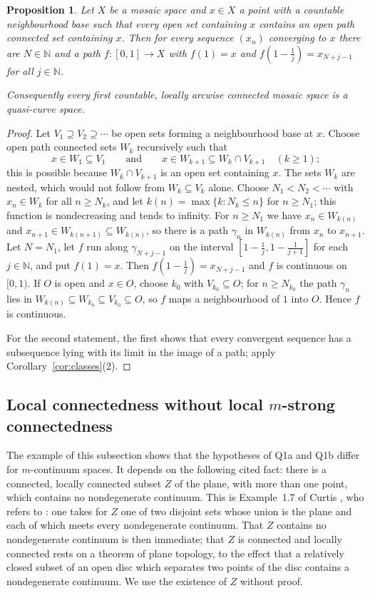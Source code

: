 \documentclass[11pt]{amsart}
\newtheorem{proposition}[theorem]{Proposition}
\theoremstyle{definition}
\theoremstyle{remark}
\newcommand{\N}{\mathbb{N}}
\numberwithin{equation}{section}
\begin{document}
\begin{proposition}\label{prop:fcpath}
Let $X$ be a mosaic space and $x\in X$ a point with a countable neighbourhood base such that every open set containing $x$ contains an open path connected set containing $x$. Then for every sequence $(x_n)$ converging to $x$ there are $N\in\N$ and a path $f\colon[0,1]\to X$ with $f(1)=x$ and $f(1-\frac1j)=x_{N+j-1}$ for all $j\in\N$.

Consequently every first countable, locally arcwise connected mosaic space is a quasi-curve space.
\end{proposition}
\begin{proof}
Let $V_1\supseteq V_2\supseteq\cdots$ be open sets forming a neighbourhood base at $x$. Choose open path connected sets $W_k$ recursively such that
\[x\in W_1\subseteq V_1\qquad\text{and}\qquad x\in W_{k+1}\subseteq W_k\cap V_{k+1}\quad(k\ge1);\]
this is possible because $W_k\cap V_{k+1}$ is an open set containing $x$. The sets $W_k$ are nested, which would not follow from $W_k\subseteq V_k$ alone. Choose $N_1<N_2<\cdots$ with $x_n\in W_k$ for all $n\ge N_k$, and let $k(n)=\max\{k:N_k\le n\}$ for $n\ge N_1$; this function is nondecreasing and tends to infinity. For $n\ge N_1$ we have $x_n\in W_{k(n)}$ and $x_{n+1}\in W_{k(n+1)}\subseteq W_{k(n)}$, so there is a path $\gamma_n$ in $W_{k(n)}$ from $x_n$ to $x_{n+1}$. Let $N=N_1$, let $f$ run along $\gamma_{N+j-1}$ on the interval $[1-\frac1j,1-\frac1{j+1}]$ for each $j\in\N$, and put $f(1)=x$. Then $f(1-\frac1j)=x_{N+j-1}$ and $f$ is continuous on $[0,1)$. If $O$ is open and $x\in O$, choose $k_0$ with $V_{k_0}\subseteq O$; for $n\ge N_{k_0}$ the path $\gamma_n$ lies in $W_{k(n)}\subseteq W_{k_0}\subseteq V_{k_0}\subseteq O$, so $f$ maps a neighbourhood of $1$ into $O$. Hence $f$ is continuous.

For the second statement, the first shows that every convergent sequence has a subsequence lying with its limit in the image of a path; apply Corollary~\ref{cor:classes}(2).
\end{proof}

\subsection{Local connectedness without local \texorpdfstring{$m$}{m}-strong connectedness}
The example of this subsection shows that the hypotheses of Q1a and Q1b differ for $m$-continuum spaces. It depends on the following cited fact: there is a connected, locally connected subset $Z$ of the plane, with more than one point, which contains no nondegenerate continuum. This is Example~1.7 of Curtis \cite{curtis80}, who refers to \cite{hockingyoung}: one takes for $Z$ one of two disjoint sets whose union is the plane and each of which meets every nondegenerate continuum. That $Z$ contains no nondegenerate continuum is then immediate; that $Z$ is connected and locally connected rests on a theorem of plane topology, to the effect that a relatively closed subset of an open disc which separates two points of the disc contains a nondegenerate continuum. We use the existence of $Z$ without proof.
\end{document}
